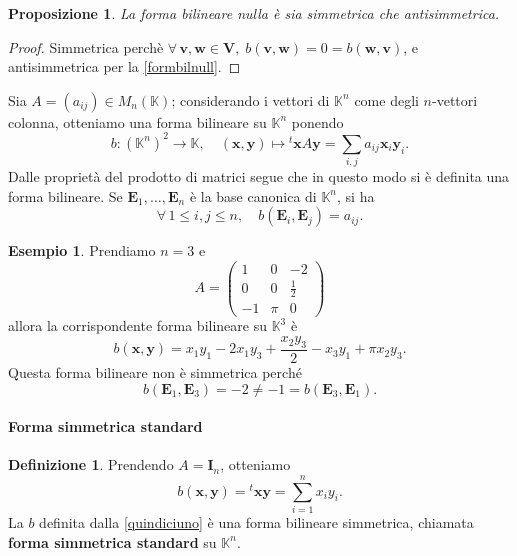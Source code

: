 \documentclass{article}
\theoremstyle{plain}
\newtheorem{prop}[thm]{Proposizione}
\theoremstyle{definition}
\newtheorem{defn}{Definizione}[section]
\newtheorem{exmp}{Esempio}[section]
\theoremstyle{remark}
\begin{document}
\vspace{10pt}

\begin{bxthm}
\begin{prop}
La forma bilineare nulla è sia simmetrica che antisimmetrica.    
\end{prop}
\end{bxthm}
\begin{proof}
    Simmetrica perchè $\forall\,\mathbf{v},\mathbf{w}\in\mathbf{V},\;b(\mathbf{v},\mathbf{w})=0=b(\mathbf{w},\mathbf{v})$, e antisimmetrica per la \ref{formbilnull}.
\end{proof}

\vspace{10pt}

Sia $A = (a_{ij}) \in M_n(\mathbb{K})$; considerando i vettori di $\mathbb{K}^n$ come degli $n$-vettori colonna, otteniamo una forma bilineare su $\mathbb{K}^n$ ponendo
\[b:(\mathbb{K}^n)^2\to\mathbb{K},\quad (\mathbf{x},\mathbf{y})\mapsto {}^t\mathbf{x}A\mathbf{y}=\sum_{i,j} a_{ij} \mathbf{x}_i \mathbf{y}_i.\]
Dalle proprietà del prodotto di matrici segue che in questo modo si è definita una forma bilineare. 
Se $\mathbf{E}_1, \ldots, \mathbf{E}_n$ è la base canonica di $\mathbb{K}^n$, si ha
\[
\forall\,1 \leq i, j \leq n,\quad b(\mathbf{E}_i, \mathbf{E}_j) = a_{ij}.
\]

\vspace{10pt}

\begin{exmp}
Prendiamo $n = 3$ e
\[
A = \begin{pmatrix}
1 & 0 & -2 \\
0 & 0 & \frac{1}{2} \\
-1 & \pi & 0
\end{pmatrix}
\]
allora la corrispondente forma bilineare su $\mathbb{K}^3$ è
\[
b(\mathbf{x},\mathbf{y}) = x_1 y_1 - 2 x_1 y_3 + \frac{x_2 y_3}{2} - x_3 y_1 + \pi x_2 y_3.
\]
Questa forma bilineare non è simmetrica perché
\[
b(\mathbf{E}_1, \mathbf{E}_3) = -2 \neq -1 = b(\mathbf{E}_3, \mathbf{E}_1).
\]    
\end{exmp}

\vspace{10pt}

\paragraph{Forma simmetrica standard}
\begin{bxthm}
\begin{defn}
Prendendo $A = \mathbf{I}_n$, otteniamo
\begin{equation}\label{quindiciuno}
    b(\mathbf{x},\mathbf{y}) = {}^t \mathbf{x y} = \sum_{i=1}^{n}x_i y_i.
\end{equation}
La $b$ definita dalla \ref{quindiciuno} è una forma bilineare simmetrica, chiamata \textbf{forma simmetrica standard} su $\mathbb{K}^n$.
\end{defn}
\end{bxthm}
\end{document}

